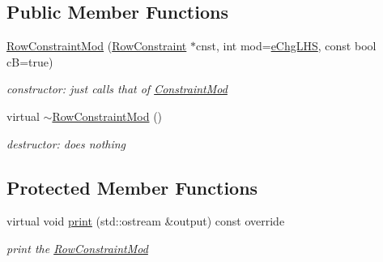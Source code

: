 \subsection*{Public Member Functions}
\begin{DoxyCompactItemize}
\item 
\mbox{\label{class_s_m_spp__di__unipi__it_1_1_row_constraint_mod_a2bdc8691edae2ba29209caa64398e435}} 
\mbox{\hyperlink{class_s_m_spp__di__unipi__it_1_1_row_constraint_mod_a2bdc8691edae2ba29209caa64398e435}{Row\+Constraint\+Mod}} (\mbox{\hyperlink{class_s_m_spp__di__unipi__it_1_1_row_constraint}{Row\+Constraint}} $\ast$cnst, int mod=\mbox{\hyperlink{class_s_m_spp__di__unipi__it_1_1_row_constraint_mod_af91e41a206e988d55a31347acd6f5d33a585aad901188269790f584a365b34813}{e\+Chg\+L\+HS}}, const bool cB=true)
\begin{DoxyCompactList}\small\item\em constructor\+: just calls that of \mbox{\hyperlink{class_s_m_spp__di__unipi__it_1_1_constraint_mod}{Constraint\+Mod}} \end{DoxyCompactList}\item 
\mbox{\label{class_s_m_spp__di__unipi__it_1_1_row_constraint_mod_aebd7d75d3847d09f0cfa437ee817cc40}} 
virtual \mbox{\hyperlink{class_s_m_spp__di__unipi__it_1_1_row_constraint_mod_aebd7d75d3847d09f0cfa437ee817cc40}{$\sim$\+Row\+Constraint\+Mod}} ()
\begin{DoxyCompactList}\small\item\em destructor\+: does nothing \end{DoxyCompactList}\end{DoxyCompactItemize}
\subsection*{Protected Member Functions}
\begin{DoxyCompactItemize}
\item 
\mbox{\label{class_s_m_spp__di__unipi__it_1_1_row_constraint_mod_a59a9fcbf8f9f86d348344b2073644b0e}} 
virtual void \mbox{\hyperlink{class_s_m_spp__di__unipi__it_1_1_row_constraint_mod_a59a9fcbf8f9f86d348344b2073644b0e}{print}} (std\+::ostream \&output) const override
\begin{DoxyCompactList}\small\item\em print the \mbox{\hyperlink{class_s_m_spp__di__unipi__it_1_1_row_constraint_mod}{Row\+Constraint\+Mod}} \end{DoxyCompactList}\end{DoxyCompactItemize}

